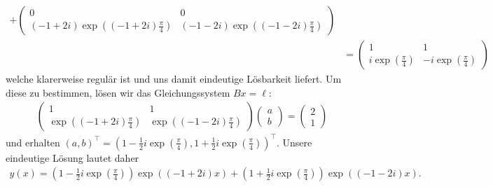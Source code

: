 \begin{solution}
\begin{enumerate}[label = \textbf{\alph*)}]
\begin{align*}
    +
    \begin{pmatrix}
       0 & 0\\ (-1 + 2i)\exp((-1 + 2i)\frac{\pi}{4}) & (-1 -2i)\exp((-1 - 2i)\frac{\pi}{4})
    \end{pmatrix} \\
    &= \begin{pmatrix}
      1 & 1\\
      i\exp(\frac{\pi}{4}) & -i\exp(\frac{\pi}{4})
    \end{pmatrix}
  \end{align*}
  welche klarerweise regulär ist und uns damit eindeutige Lösbarkeit liefert.
  Um diese zu bestimmen, lösen wir das Gleichungssystem $Bx = \ell$:
  \begin{align*}
    \begin{pmatrix}
      1 & 1\\
      \exp((-1+2i)\frac{\pi}{4}) & \exp((-1-2i)\frac{\pi}{4})
    \end{pmatrix}
    \begin{pmatrix}
      a \\ b
    \end{pmatrix} =
    \begin{pmatrix}
      2 \\ 1
    \end{pmatrix}
    \end{align*}
  und erhalten $(a,b)^{\top} = (1-\frac{1}{2}i \exp(\frac{\pi}{4}),
  1+\frac{1}{2}i \exp(\frac{\pi}{4}))^{\top}$.
  Unsere eindeutige Lösung lautet daher
  \begin{align*}
    y(x) = (1-\frac{1}{2}i \exp(\frac{\pi}{4}))\exp((-1 + 2i)x) + (1+\frac{1}{2}i \exp(\frac{\pi}{4}))\exp((-1-2i)x).
  \end{align*}
\end{enumerate}
\end{solution}
